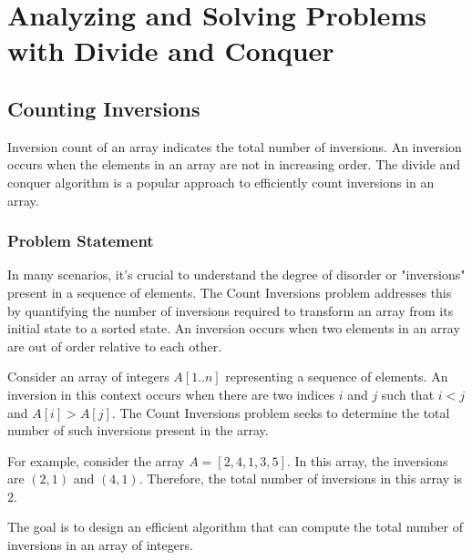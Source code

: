 \documentclass[12pt]{book} %
\begin{document}
\section{Analyzing and Solving Problems with Divide and Conquer}
\subsection{Counting Inversions}
Inversion count of an array indicates the total number of inversions. An inversion occurs when the elements in an array are not in increasing order. The divide and conquer algorithm is a popular approach to efficiently count inversions in an array.

\subsubsection{Problem Statement}
In many scenarios, it's crucial to understand the degree of disorder or "inversions" present in a sequence of elements. The Count Inversions problem addresses this by quantifying the number of inversions required to transform an array from its initial state to a sorted state. An inversion occurs when two elements in an array are out of order relative to each other.

Consider an array of integers $A[1..n]$ representing a sequence of elements. An inversion in this context occurs when there are two indices $i$ and $j$ such that $i < j$ and $A[i] > A[j]$. The Count Inversions problem seeks to determine the total number of such inversions present in the array.

For example, consider the array $A = [2, 4, 1, 3, 5]$. In this array, the inversions are $(2, 1)$ and $(4, 1)$. Therefore, the total number of inversions in this array is $2$.

The goal is to design an efficient algorithm that can compute the total number of inversions in an array of integers.
\end{document}
